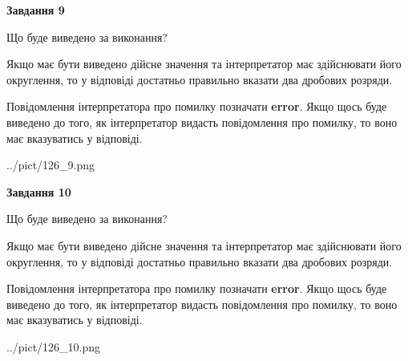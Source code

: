 \documentclass[12pt, ukrainian]{article}
\begin{document}
{\begin {Large}
{\begin {center}\textbf{Завдання 9}\end {center}}\par
Що буде виведено за виконання? \par

Якщо має бути виведено дійсне значення та інтерпретатор має здійснювати його округлення, 
то у відповіді достатньо правильно вказати два дробових розряди.

Повідомлення інтерпретатора про помилку позначати \textbf{error}.
Якщо щось буде виведено до того, як інтерпретатор видасть повідомлення про помилку, 
то воно має вказуватись у відповіді. \par

\begin{center}
	{../pict/126_9.png}
\end{center}
\newpage

{\begin {center}\textbf{Завдання 10}\end {center}}\par
Що буде виведено за виконання? \par

Якщо має бути виведено дійсне значення та інтерпретатор має здійснювати його округлення, 
то у відповіді достатньо правильно вказати два дробових розряди.

Повідомлення інтерпретатора про помилку позначати \textbf{error}.
Якщо щось буде виведено до того, як інтерпретатор видасть повідомлення про помилку, 
то воно має вказуватись у відповіді. \par

\begin{center}
	{../pict/126_10.png}
\end{center}
\newpage

\end {Large}}
\end{document}
